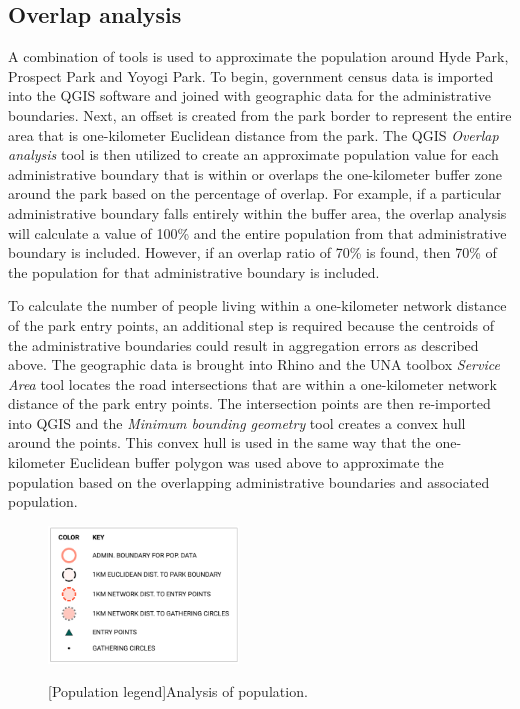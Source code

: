 \begin{multicols}{2}

\subsection{Overlap analysis}
A combination of tools is used to approximate the population around Hyde Park, Prospect Park and Yoyogi Park. To begin, government census data is imported into the QGIS software and joined with geographic data for the administrative boundaries. Next, an offset is created from the park border to represent the entire area that is one-kilometer Euclidean distance from the park. The QGIS \textit{Overlap analysis} tool is then utilized to create an approximate population value for each administrative boundary that is within or overlaps the one-kilometer buffer zone around the park based on the percentage of overlap. For example, if a particular administrative boundary falls entirely within the buffer area, the overlap analysis will calculate a value of 100\% and the entire population from that administrative boundary is included. However, if an overlap ratio of 70\% is found, then 70\% of the population for that administrative boundary is included. 

To calculate the number of people living within a one-kilometer network distance of the park entry points, an additional step is required because the centroids of the administrative boundaries could result in aggregation errors as described above. The geographic data is brought into Rhino and the UNA toolbox \textit{Service Area} tool locates the road intersections that are within a one-kilometer network distance of the park entry points. The intersection points are then re-imported into QGIS and the \textit{Minimum bounding geometry} tool creates a convex hull around the points. This convex hull is used in the same way that the one-kilometer Euclidean buffer polygon was used above to approximate the population based on the overlapping administrative boundaries and associated population.

\begin{figure}[H]
  \centering
  \includegraphics[width=0.45\textwidth]{images/network/approx_pop_legend.png}\par{}[Population legend]{Analysis of population.}
  \label{fig:approx_pop_legend}
\end{figure} 

\end{multicols}

